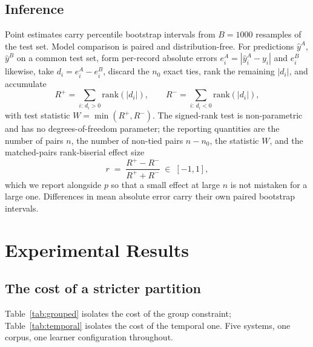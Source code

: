 \documentclass[conference,a4paper]{IEEEtran}
\begin{document}
\subsection{Inference}

Point estimates carry percentile bootstrap intervals from $B = 1000$
resamples of the test set. Model comparison is paired and
distribution-free. For predictions $\hat{y}^{A}$, $\hat{y}^{B}$ on a
common test set, form per-record absolute errors
$e^{A}_i = |\hat{y}^{A}_i - y_i|$ and $e^{B}_i$ likewise, take
$d_i = e^{A}_i - e^{B}_i$, discard the $n_0$ exact ties, rank the
remaining $|d_i|$, and accumulate
\begin{equation}
R^{+} = \!\!\sum_{i:\, d_i > 0}\!\! \mathrm{rank}(|d_i|),
\qquad
R^{-} = \!\!\sum_{i:\, d_i < 0}\!\! \mathrm{rank}(|d_i|) ,
\end{equation}
with test statistic $W = \min(R^{+}, R^{-})$. The signed-rank test is
non-parametric and has no degrees-of-freedom parameter; the reporting
quantities are the number of pairs $n$, the number of non-tied pairs
$n - n_0$, the statistic $W$, and the matched-pairs rank-biserial effect
size
\begin{equation}
r \;=\; \frac{R^{+} - R^{-}}{R^{+} + R^{-}} \;\in\; [-1, 1] ,
\end{equation}
which we report alongside $p$ so that a small effect at large $n$ is not
mistaken for a large one. Differences in mean absolute error carry their
own paired bootstrap intervals.

\section{Experimental Results}
\label{sec:results}

\subsection{The cost of a stricter partition}

Table~\ref{tab:grouped} isolates the cost of the group constraint;
Table~\ref{tab:temporal} isolates the cost of the temporal one. Five
systems, one corpus, one learner configuration throughout.
\end{document}
